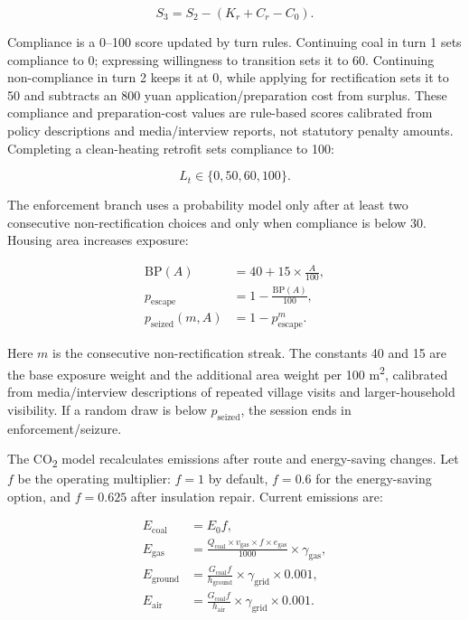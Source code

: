 \documentclass[stu,12pt,floatsintext,donotrepeattitle]{apa7}
\begin{document}
\begin{equation}
S_3 = S_2 - \left(K_r + C_r - C_0\right).
\end{equation}

Compliance is a 0--100 score updated by turn rules. Continuing coal in turn 1 sets compliance to 0; expressing willingness to transition sets it to 60. Continuing non-compliance in turn 2 keeps it at 0, while applying for rectification sets it to 50 and subtracts an 800 yuan application/preparation cost from surplus. These compliance and preparation-cost values are rule-based scores calibrated from policy descriptions and media/interview reports, not statutory penalty amounts. Completing a clean-heating retrofit sets compliance to 100:

\begin{equation}
L_t \in \{0,50,60,100\}.
\end{equation}

The enforcement branch uses a probability model only after at least two consecutive non-rectification choices and only when compliance is below 30. Housing area increases exposure:

\begin{align}
\mathrm{BP}(A) &= 40 + 15 \times \frac{A}{100}, \\
p_{\mathrm{escape}} &= 1 - \frac{\mathrm{BP}(A)}{100}, \\
p_{\mathrm{seized}}(m,A) &= 1 - p_{\mathrm{escape}}^{m}.
\end{align}

Here \(m\) is the consecutive non-rectification streak. The constants 40 and 15 are the base exposure weight and the additional area weight per 100 m\textsuperscript{2}, calibrated from media/interview descriptions of repeated village visits and larger-household visibility. If a random draw is below \(p_{\mathrm{seized}}\), the session ends in enforcement/seizure.

The CO\textsubscript{2} model recalculates emissions after route and energy-saving changes. Let \(f\) be the operating multiplier: \(f=1\) by default, \(f=0.6\) for the energy-saving option, and \(f=0.625\) after insulation repair. Current emissions are:

\begin{align}
E_{\mathrm{coal}} &= E_0 f, \\
E_{\mathrm{gas}} &= \frac{Q_{\mathrm{coal}} \times v_{\mathrm{gas}} \times f \times e_{\mathrm{gas}}}{1000} \times \gamma_{\mathrm{gas}}, \\
E_{\mathrm{ground}} &= \frac{G_{\mathrm{coal}} f}{h_{\mathrm{ground}}} \times \gamma_{\mathrm{grid}} \times 0.001, \\
E_{\mathrm{air}} &= \frac{G_{\mathrm{coal}} f}{h_{\mathrm{air}}} \times \gamma_{\mathrm{grid}} \times 0.001.
\end{align}
\end{document}
